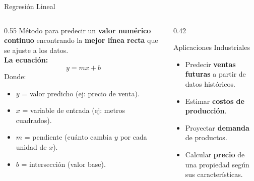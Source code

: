 \documentclass[aspectratio=169]{beamer}
\begin{document}
\begin{frame}{Regresión Lineal}
  \begin{columns}[T]
    \begin{column}{0.55\textwidth}
      \small
      Método para predecir un \textbf{valor numérico continuo}
      encontrando la \textbf{mejor línea recta} que se ajuste
      a los datos.\\[8pt]
      \textbf{La ecuación:}
      \begin{equation*}
        y = mx + b
      \end{equation*}
      Donde:
      \begin{itemize}\setlength\itemsep{2pt}
        \item $y$ = valor predicho (ej: precio de venta).
        \item $x$ = variable de entrada (ej: metros cuadrados).
        \item $m$ = pendiente (cuánto cambia $y$ por cada unidad de $x$).
        \item $b$ = intersección (valor base).
      \end{itemize}
    \end{column}
    \begin{column}{0.42\textwidth}
      \begin{conceptbox}{\faChartLine\enspace Aplicaciones Industriales}
        \small
        \begin{itemize}\setlength\itemsep{3pt}
          \item Predecir \textbf{ventas futuras} a partir de datos históricos.
          \item Estimar \textbf{costos de producción}.
          \item Proyectar \textbf{demanda} de productos.
          \item Calcular \textbf{precio} de una propiedad según sus características.
        \end{itemize}
      \end{conceptbox}
    \end{column}
  \end{columns}
\end{frame}
\end{document}
